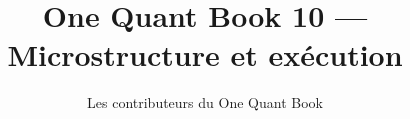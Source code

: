 \documentclass[11pt,a4paper,twoside,openany]{book}
\title{One Quant Book 10 --- Microstructure et exécution}
\author{Les contributeurs du One Quant Book}
\date{\bookdate}
\begin{document}
\frontmatter



\tableofcontents

\mainmatter


\appendix
\part{\omsolutionspart}


\backmatter
\printindex
\end{document}
